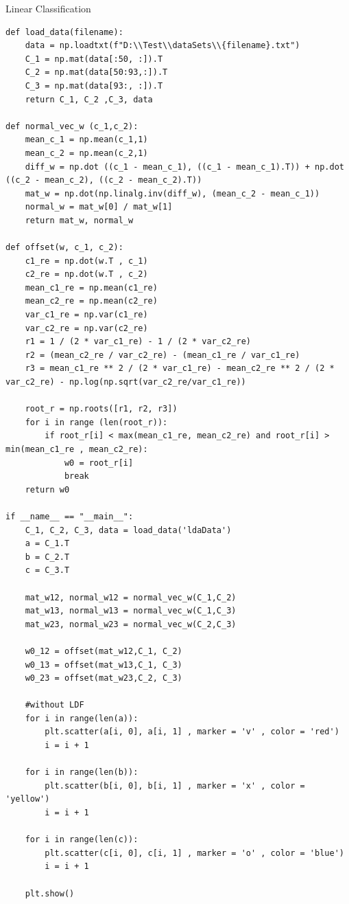 \documentclass[
	ngerman,
     solution=true
	]{tudaexercise}
\begin{document}
\begin{task}{Linear Classification}
\begin{subtask}[2b)]
\begin{lstlisting}
def load_data(filename):
    data = np.loadtxt(f"D:\\Test\\dataSets\\{filename}.txt")
    C_1 = np.mat(data[:50, :]).T
    C_2 = np.mat(data[50:93,:]).T
    C_3 = np.mat(data[93:, :]).T
    return C_1, C_2 ,C_3, data

def normal_vec_w (c_1,c_2):
    mean_c_1 = np.mean(c_1,1)
    mean_c_2 = np.mean(c_2,1)
    diff_w = np.dot ((c_1 - mean_c_1), ((c_1 - mean_c_1).T)) + np.dot ((c_2 - mean_c_2), ((c_2 - mean_c_2).T))
    mat_w = np.dot(np.linalg.inv(diff_w), (mean_c_2 - mean_c_1)) 
    normal_w = mat_w[0] / mat_w[1]
    return mat_w, normal_w

def offset(w, c_1, c_2):
    c1_re = np.dot(w.T , c_1)
    c2_re = np.dot(w.T , c_2)
    mean_c1_re = np.mean(c1_re)
    mean_c2_re = np.mean(c2_re)
    var_c1_re = np.var(c1_re)
    var_c2_re = np.var(c2_re)
    r1 = 1 / (2 * var_c1_re) - 1 / (2 * var_c2_re)
    r2 = (mean_c2_re / var_c2_re) - (mean_c1_re / var_c1_re)
    r3 = mean_c1_re ** 2 / (2 * var_c1_re) - mean_c2_re ** 2 / (2 * var_c2_re) - np.log(np.sqrt(var_c2_re/var_c1_re))
    
    root_r = np.roots([r1, r2, r3])
    for i in range (len(root_r)):
        if root_r[i] < max(mean_c1_re, mean_c2_re) and root_r[i] > min(mean_c1_re , mean_c2_re):
            w0 = root_r[i]
            break 
    return w0

if __name__ == "__main__":
    C_1, C_2, C_3, data = load_data('ldaData')
    a = C_1.T
    b = C_2.T
    c = C_3.T
    
    mat_w12, normal_w12 = normal_vec_w(C_1,C_2)
    mat_w13, normal_w13 = normal_vec_w(C_1,C_3)
    mat_w23, normal_w23 = normal_vec_w(C_2,C_3)
    
    w0_12 = offset(mat_w12,C_1, C_2)
    w0_13 = offset(mat_w13,C_1, C_3)
    w0_23 = offset(mat_w23,C_2, C_3)
    
    #without LDF
    for i in range(len(a)):
        plt.scatter(a[i, 0], a[i, 1] , marker = 'v' , color = 'red')
        i = i + 1
        
    for i in range(len(b)):
        plt.scatter(b[i, 0], b[i, 1] , marker = 'x' , color = 'yellow')
        i = i + 1
        
    for i in range(len(c)):
        plt.scatter(c[i, 0], c[i, 1] , marker = 'o' , color = 'blue')
        i = i + 1
        
    plt.show()


\end{lstlisting}
\end{subtask}
\end{task}
\end{document}
